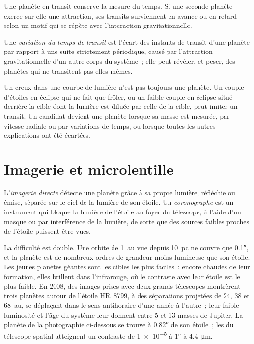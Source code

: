 Une planète en transit conserve la mesure du temps. Si une seconde planète exerce sur elle
une attraction, ses transits surviennent en avance ou en retard selon un motif qui se répète
avec l'interaction gravitationnelle.

\begin{definition}\label{def:b3:exoplanets:ttv}
Une \emph{variation du temps de transit} est
l'écart des instants de transit d'une planète par rapport à une suite strictement périodique,
causé par l'attraction gravitationnelle d'un autre corps du
système~; elle peut révéler, et peser, des planètes qui ne transitent pas
elles-mêmes.
\end{definition}

Un creux dans une courbe de lumière n'est pas toujours une planète. Un couple d'étoiles
en éclipse qui ne fait que frôler, ou un faible couple en éclipse situé derrière la cible dont
la lumière est diluée par celle de la cible, peut imiter un transit. Un candidat devient
une planète lorsque sa masse est mesurée, par vitesse radiale ou par variations de temps,
ou lorsque toutes les autres explications ont été écartées.

\section{Imagerie et microlentille}\label{sec:b3:exoplanets:imaging}

\begin{definition}\label{def:b3:exoplanets:imaging}
L'\emph{imagerie directe} détecte une planète grâce à sa propre
lumière, réfléchie ou émise, séparée sur le ciel de la lumière de son étoile.
Un \emph{coronographe} est un instrument qui bloque la lumière
de l'étoile au foyer du télescope, à l'aide d'un masque ou par interférence
de la lumière, de sorte que des sources faibles proches de l'étoile
puissent être vues.
\end{definition}

La difficulté est double. Une orbite de \qty{1}{au} vue depuis \qty{10}{pc}
ne couvre que \ang{;;0.1}, et la planète est de nombreux ordres de grandeur moins
lumineuse que son étoile. Les jeunes planètes géantes sont les cibles les plus faciles~:
encore chaudes de leur formation, elles brillent dans l'infrarouge, où le contraste avec leur
étoile est le plus faible. En 2008, des images prises avec deux grands télescopes montrèrent trois
planètes autour de l'étoile HR~8799, à des séparations projetées de 24, 38 et
\qty{68}{au}, se déplaçant dans le sens antihoraire d'une année à l'autre~; leur faible
luminosité et l'âge du système leur donnent entre 5 et 13 masses
de Jupiter. La planète de la photographie ci-dessous se trouve à \ang{;;0.82} de son
étoile~; les  du télescope spatial atteignent un contraste de
\num{1e-5} à \ang{;;1} à \qty{4.4}{\micro m}.

